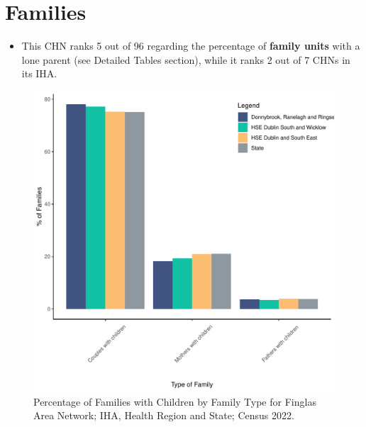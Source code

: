 \documentclass{article}
\begin{document}
\section{Families}\label{sect:Fam}
\begin{itemize}
\item This CHN ranks  5 out of 96 regarding the percentage of \textbf{family units} with a lone parent (see Detailed Tables section), while it ranks   2 out of 7 CHNs in its IHA.
\end{itemize}
\begin{figure}[H]
	\centering
	\includegraphics[width = 150mm]{../figures/FamED.pdf}
	\caption{Percentage of Families with Children by Family Type for Finglas Area Network; IHA, Health Region and State; Census 2022.}
	\label{fig:vbnv}
	\end{figure}
	
\end{document}
